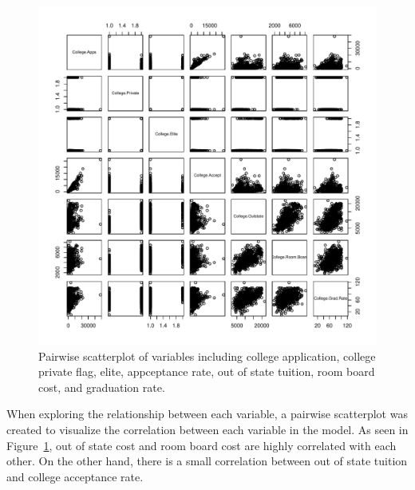 \documentclass{article}\usepackage[]{graphicx}\usepackage[]{color}
\newenvironment{knitrout}{}{} %
\begin{document}
\begin{figure}[H]
\begin{center}
\begin{knitrout}
\color{fgcolor}
\includegraphics[width=5in]{figure/unnamed-chunk-2-1} 

\end{knitrout}
\caption{Pairwise scatterplot of variables including college application, college private flag, elite, appceptance rate, out of state tuition, room board cost, and graduation rate.}
\label{pairwise_scatterplot}
\end{center}
\end{figure}

When exploring the relationship between each variable, a pairwise scatterplot was created to visualize the correlation between each variable in the model. As seen in Figure~\ref{pairwise_scatterplot}, out of state cost and room board cost are highly correlated with each other. On the other hand, there is a small correlation between out of state tuition and college acceptance rate.
\end{document}
